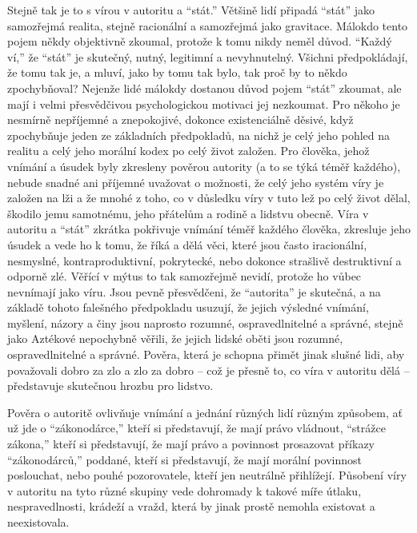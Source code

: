 \documentclass{book}
\begin{document}
Stejně tak je to s vírou v autoritu a \enquote{stát.} Většině lidí připadá \enquote{stát} jako samozřejmá realita, stejně racionální a samozřejmá jako gravitace. Málokdo tento pojem někdy objektivně zkoumal, protože k tomu nikdy neměl důvod. \enquote{Každý ví,} že \enquote{stát} je skutečný, nutný, legitimní a nevyhnutelný. Všichni předpokládají, že tomu tak je, a mluví, jako by tomu tak bylo, tak proč by to někdo zpochybňoval? Nejenže lidé málokdy dostanou důvod pojem \enquote{stát} zkoumat, ale mají i velmi přesvědčivou psychologickou motivaci jej nezkoumat. Pro někoho je nesmírně nepříjemné a znepokojivé, dokonce existenciálně děsivé, když zpochybňuje jeden ze základních předpokladů, na nichž je celý jeho pohled na realitu a celý jeho morální kodex po celý život založen. Pro člověka, jehož vnímání a úsudek byly zkresleny pověrou autority (a to se týká téměř každého), nebude snadné ani příjemné uvažovat o možnosti, že celý jeho systém víry je založen na lži a že mnohé z toho, co v důsledku víry v tuto lež po celý život dělal, škodilo jemu samotnému, jeho přátelům a rodině a lidstvu obecně. Víra v autoritu a \enquote{stát} zkrátka pokřivuje vnímání téměř každého člověka, zkresluje jeho úsudek a vede ho k tomu, že říká a dělá věci, které jsou často iracionální, nesmyslné, kontraproduktivní, pokrytecké, nebo dokonce strašlivě destruktivní a odporně zlé. Věřící v mýtus to tak samozřejmě nevidí, protože ho vůbec nevnímají jako víru. Jsou pevně přesvědčeni, že \enquote{autorita} je skutečná, a na základě tohoto falešného předpokladu usuzují, že jejich výsledné vnímání, myšlení, názory a činy jsou naprosto rozumné, ospravedlnitelné a správné, stejně jako Aztékové nepochybně věřili, že jejich lidské oběti jsou rozumné, ospravedlnitelné a správné. Pověra, která je schopna přimět jinak slušné lidi, aby považovali dobro za zlo a zlo za dobro -- což je přesně to, co víra v autoritu dělá -- představuje skutečnou hrozbu pro lidstvo.

Pověra o autoritě ovlivňuje vnímání a jednání různých lidí různým způsobem, ať už jde o \enquote{zákonodárce,} kteří si představují, že mají právo vládnout, \enquote{strážce zákona,} kteří si představují, že mají právo a povinnost prosazovat příkazy \enquote{zákonodárců,} poddané, kteří si představují, že mají morální povinnost poslouchat, nebo pouhé pozorovatele, kteří jen neutrálně přihlížejí. Působení víry v autoritu na tyto různé skupiny vede dohromady k takové míře útlaku, nespravedlnosti, krádeží a vražd, která by jinak prostě nemohla existovat a neexistovala.
\end{document}

